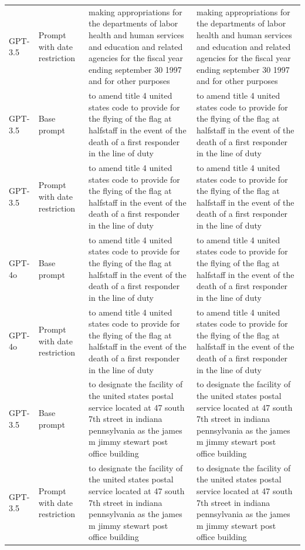 \begin{longtable}{>{\raggedright\arraybackslash}p{1.4cm}>{\raggedright\arraybackslash}p{1.4cm}>{\raggedright\arraybackslash}p{5.5cm}>{\raggedright\arraybackslash}p{5.5cm}}
GPT-3.5 & Prompt with date restriction & making appropriations for the departments of labor health and human services and education and related agencies for the fiscal year ending september 30 1997 and for other purposes & making appropriations for the departments of labor health and human services and education and related agencies for the fiscal year ending september 30 1997 and for other purposes\\
GPT-3.5 & Base prompt & to amend title 4 united states code to provide for the flying of the flag at halfstaff in the event of the death of a first responder in the line of duty & to amend title 4 united states code to provide for the flying of the flag at halfstaff in the event of the death of a first responder in the line of duty\\
GPT-3.5 & Prompt with date restriction & to amend title 4 united states code to provide for the flying of the flag at halfstaff in the event of the death of a first responder in the line of duty & to amend title 4 united states code to provide for the flying of the flag at halfstaff in the event of the death of a first responder in the line of duty\\
GPT-4o & Base prompt & to amend title 4 united states code to provide for the flying of the flag at halfstaff in the event of the death of a first responder in the line of duty & to amend title 4 united states code to provide for the flying of the flag at halfstaff in the event of the death of a first responder in the line of duty\\
GPT-4o & Prompt with date restriction & to amend title 4 united states code to provide for the flying of the flag at halfstaff in the event of the death of a first responder in the line of duty & to amend title 4 united states code to provide for the flying of the flag at halfstaff in the event of the death of a first responder in the line of duty\\
GPT-3.5 & Base prompt & to designate the facility of the united states postal service located at 47 south 7th street in indiana pennsylvania as the james m jimmy stewart post office building & to designate the facility of the united states postal service located at 47 south 7th street in indiana pennsylvania as the james m jimmy stewart post office building\\
GPT-3.5 & Prompt with date restriction & to designate the facility of the united states postal service located at 47 south 7th street in indiana pennsylvania as the james m jimmy stewart post office building & to designate the facility of the united states postal service located at 47 south 7th street in indiana pennsylvania as the james m jimmy stewart post office building\\

\end{longtable}
